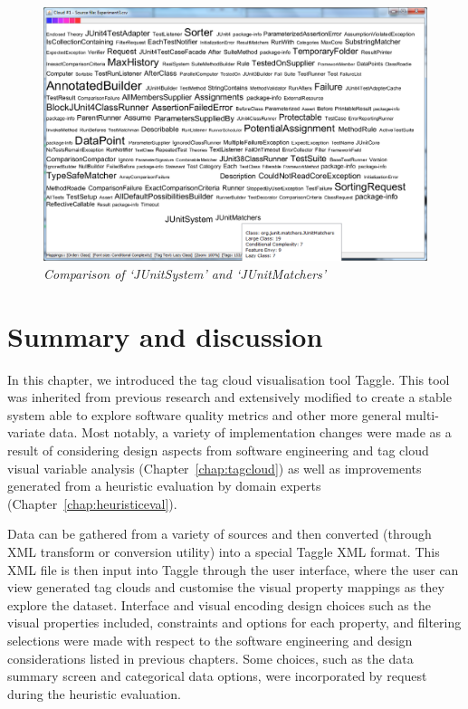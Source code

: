\begin{figure}[!htb]
  	\centering
   	\includegraphics[scale=0.35]{comparison.png}
  	\caption{\textit{Comparison of `JUnitSystem' and `JUnitMatchers'}}
	\label{fig:comparison}
\end{figure}

\section{Summary and discussion}

In this chapter, we introduced the tag cloud visualisation tool Taggle. This tool was inherited from previous research and extensively modified to create a stable system able to explore software quality metrics and other more general multi-variate data. Most notably, a variety of implementation changes were made as a result of considering design aspects from software engineering and tag cloud visual variable analysis (Chapter~\ref{chap:tagcloud}) as well as improvements generated from a heuristic evaluation by domain experts (Chapter~\ref{chap:heuristiceval}).

Data can be gathered from a variety of sources and then converted (through XML transform or conversion utility) into a special Taggle XML format. This XML file is then input into Taggle through the user interface, where the user can view generated tag clouds and customise the visual property mappings as they explore the dataset. Interface and visual encoding design choices such as the visual properties included, constraints and options for each property, and filtering selections were made with respect to the software engineering and design considerations listed in previous chapters. Some choices, such as the data summary screen and categorical data options, were incorporated by request during the heuristic evaluation.

